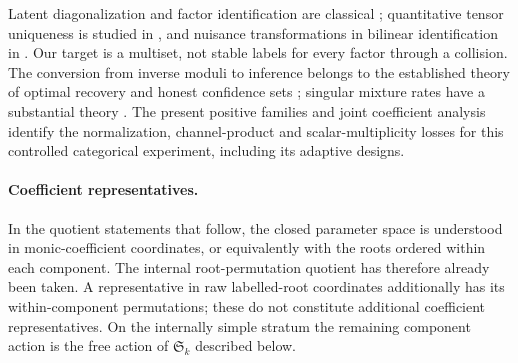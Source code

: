 \documentclass[11pt,reqno]{amsart}
\numberwithin{equation}{section}
\theoremstyle{definition}\newtheorem{definition}[theorem]{Definition}
\theoremstyle{remark}\newtheorem{remark}[theorem]{Remark}
\begin{document}
Latent diagonalization and factor identification are classical
\cite{AMR,BJR}; quantitative tensor uniqueness is studied in
\cite{BCV}, and nuisance transformations in bilinear identification
in \cite{LLB}. Our target is a multiset, not stable labels for every
factor through a collision. The conversion from inverse moduli to
inference belongs to the established theory of optimal recovery and
honest confidence sets \cite{Donoho,CaiLow,Dufour}; singular mixture
rates have a substantial theory \cite{HN}. The present positive
families and joint coefficient analysis identify the normalization,
channel-product and scalar-multiplicity losses for this controlled
categorical experiment, including its adaptive designs.





\paragraph{Coefficient representatives.}
In the quotient statements that follow, the closed parameter space is
understood in monic-coefficient coordinates, or equivalently with the
roots ordered within each component. The internal root-permutation
quotient has therefore already been taken. A representative in raw
labelled-root coordinates additionally has its within-component
permutations; these do not constitute additional coefficient
representatives. On the internally simple stratum the remaining
component action is the free action of $\mathfrak S_k$ described below.
















\end{document}
